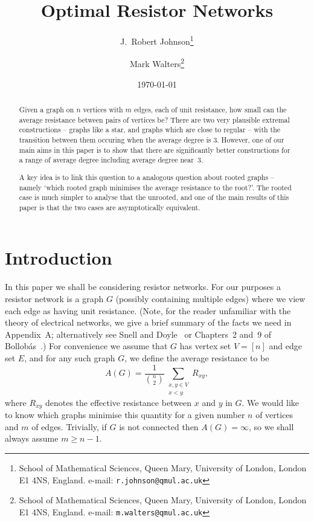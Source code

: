 \documentclass[11pt]{article}
\theoremstyle{remark}
\begin{document}
\title{Optimal Resistor Networks}
\author{J.~Robert Johnson\footnote{School of Mathematical Sciences, Queen Mary,
University of London, London E1 4NS, England. e-mail: \tt{r.johnson@qmul.ac.uk}} \and Mark Walters\footnote{School of Mathematical Sciences, Queen Mary,
University of London, London E1 4NS, England. e-mail: \tt{m.walters@qmul.ac.uk}}}
\date\today
\maketitle
\begin{abstract}

Given a graph on $n$ vertices with $m$ edges, each of unit resistance,
how small can the average resistance between pairs of vertices be?
There are two very plausible extremal constructions -- graphs like a
star, and graphs which are close to regular -- with the transition
between them occuring when the average degree is $3$. However, one of
our main aims in this paper is to show that there are significantly
better constructions for a range of average degree including average degree near~$3$.

  A key idea is to link this question to a analogous question about
  rooted graphs -- namely `which rooted graph minimises the average
  resistance to the root?'. The rooted case is much simpler to analyse
  that the unrooted, and one of the main results of this paper is that
  the two cases are asymptotically equivalent.
\end{abstract}

\section{Introduction}\label{s:intro}


In this paper we shall be considering resistor networks. For our
purposes a resistor network is a graph $G$ (possibly containing
multiple edges) where we view each edge as having unit
resistance. (Note, for the reader unfamiliar with the theory of
electrical networks, we give a brief summary of the facts we need in
Appendix~A; alternatively see Snell and Doyle~\cite{MR920811} or
Chapters~2 and~9 of Bollob\'as~\cite{MR1633290}.)  For convenience we
assume that $G$ has vertex set $V=[n]$ and edge set $E$, and for any such
graph $G$, we define the average resistance to be
\[
A(G)=\frac{1}{\binom{n}{2}}\sum_{\substack{x,y\in V\\ x<y}}R_{xy},
\]
where $R_{xy}$ denotes the effective resistance between $x$ and $y$ in
$G$.  We would like to know which graphs minimise this quantity for a
given number $n$ of vertices and $m$ of edges.  Trivially,
if $G$ is not connected then $A(G)=\infty$, so we shall always assume
$m\ge n-1$.
\end{document}

